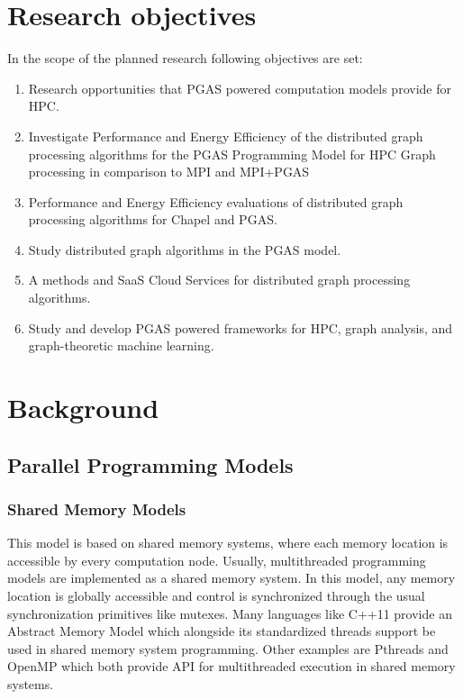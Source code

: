 \documentclass[14pt]{extreport}
\newcommand\blankpage{
    \null
    \thispagestyle{empty}
    \newpage
    }
\begin{document}
\blankpage
\chapter{Research objectives}
In the scope of the planned research following objectives are set:

\begin{enumerate}
	\item Research opportunities that PGAS powered computation models provide for HPC.
	\item Investigate Performance and Energy Efficiency of the distributed graph processing algorithms for the PGAS Programming Model for HPC Graph processing in comparison to MPI and MPI+PGAS
	\item Performance and Energy Efficiency evaluations of distributed graph processing algorithms for Chapel and PGAS.
	\item Study distributed graph algorithms in the PGAS model.
	\item A methods and SaaS Cloud Services for distributed graph processing algorithms.
	\item Study and develop PGAS powered frameworks for HPC, graph analysis, and graph-theoretic machine learning.
\end{enumerate}

\blankpage
\chapter{Background}
\section{Parallel Programming Models}
\subsection{Shared Memory Models}
This model is based on shared memory systems, where each memory location is accessible by every computation node. Usually, multithreaded programming models are implemented as a shared memory system. In this model, any memory location is globally accessible and control is synchronized through the usual synchronization primitives like mutexes. Many languages like C++11 provide an Abstract Memory Model which alongside its standardized threads support be used in shared memory system programming. Other examples are Pthreads and OpenMP which both provide API for multithreaded execution in shared memory systems.
\end{document}

